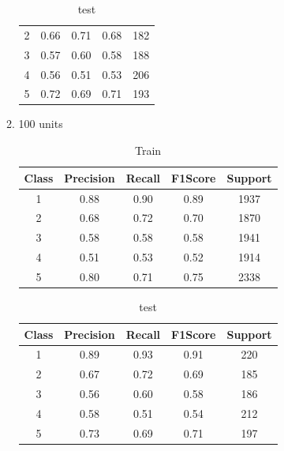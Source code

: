 \begin{enumerate}[label=(\alph*)]
\begin{enumerate}[label=\roman*.]
\begin{table}[!htb]
\begin{tabular}{ccccc}
            2     & 0.66      & 0.71   & 0.68    & 182     \\
            3     & 0.57      & 0.60   & 0.58    & 188     \\
            4     & 0.56      & 0.51   & 0.53    & 206     \\
            5     & 0.72      & 0.69   & 0.71    & 193     \\ \hline
            \end{tabular}
            \caption{test}
            \label{part b test depth 50}
        \end{table}
        \newpage
        \item 100 units
        \begin{table}[!htb]
            \centering
            \begin{tabular}{ccccc}
            \hline
            Class & Precision & Recall & F1Score & Support \\ \hline
            1     & 0.88      & 0.90   & 0.89    & 1937    \\
            2     & 0.68      & 0.72   & 0.70    & 1870    \\
            3     & 0.58      & 0.58   & 0.58    & 1941    \\
            4     & 0.51      & 0.53   & 0.52    & 1914    \\
            5     & 0.80      & 0.71   & 0.75    & 2338    \\ \hline
            \end{tabular}
            \caption{Train}
            \label{part b train depth 100}
        \end{table}
        \begin{table}[!htb]
            \centering
            \begin{tabular}{ccccc}
            \hline
            Class & Precision & Recall & F1Score & Support \\ \hline
            1     & 0.89      & 0.93   & 0.91    & 220     \\
            2     & 0.67      & 0.72   & 0.69    & 185     \\
            3     & 0.56      & 0.60   & 0.58    & 186     \\
            4     & 0.58      & 0.51   & 0.54    & 212     \\
            5     & 0.73      & 0.69   & 0.71    & 197     \\ \hline
            \end{tabular}
            \caption{test}
            \label{part b test depth 100}
        \end{table}


\end{enumerate}
\end{enumerate}
